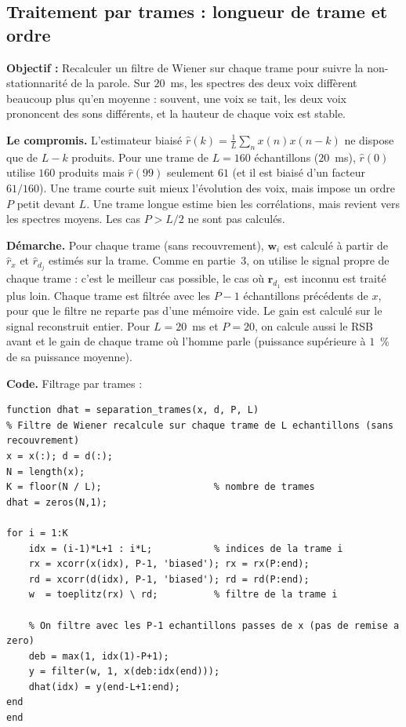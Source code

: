 \subsection{Traitement par trames : longueur de trame et ordre}

\begin{enonce}
\textbf{Objectif :} Recalculer un filtre de Wiener sur chaque trame pour suivre la non-stationnarité de la parole. Sur $20$~ms, les spectres des deux voix diffèrent beaucoup plus qu'en moyenne : souvent, une voix se tait, les deux voix prononcent des sons différents, et la hauteur de chaque voix est stable.
\end{enonce}

\textbf{Le compromis.} L'estimateur biaisé $\hat r(k)=\frac1L\sum_n x(n)x(n-k)$ ne dispose que de $L-k$ produits. Pour une trame de $L=160$ échantillons ($20$~ms), $\hat r(0)$ utilise $160$ produits mais $\hat r(99)$ seulement $61$ (et il est biaisé d'un facteur $61/160$). Une trame courte suit mieux l'évolution des voix, mais impose un ordre $P$ petit devant $L$. Une trame longue estime bien les corrélations, mais revient vers les spectres moyens. Les cas $P>L/2$ ne sont pas calculés.

\textbf{Démarche.} Pour chaque trame (sans recouvrement), $\mathbf{w}_i$ est calculé à partir de $\hat r_x$ et $\hat r_{d_j}$ estimés sur la trame. Comme en partie~3, on utilise le signal propre de chaque trame : c'est le meilleur cas possible, le cas où $\mathbf{r}_{d_1}$ est inconnu est traité plus loin. Chaque trame est filtrée avec les $P-1$ échantillons précédents de $x$, pour que le filtre ne reparte pas d'une mémoire vide. Le gain est calculé sur le signal reconstruit entier. Pour $L=20$~ms et $P=20$, on calcule aussi le RSB avant et le gain de chaque trame où l'homme parle (puissance supérieure à $1$~\% de sa puissance moyenne).

\textbf{Code.} Filtrage par trames :
\begin{lstlisting}
function dhat = separation_trames(x, d, P, L)
% Filtre de Wiener recalcule sur chaque trame de L echantillons (sans recouvrement)
x = x(:); d = d(:);
N = length(x);
K = floor(N / L);                    % nombre de trames
dhat = zeros(N,1);

for i = 1:K
    idx = (i-1)*L+1 : i*L;           % indices de la trame i
    rx = xcorr(x(idx), P-1, 'biased'); rx = rx(P:end);
    rd = xcorr(d(idx), P-1, 'biased'); rd = rd(P:end);
    w  = toeplitz(rx) \ rd;          % filtre de la trame i

    % On filtre avec les P-1 echantillons passes de x (pas de remise a zero)
    deb = max(1, idx(1)-P+1);
    y = filter(w, 1, x(deb:idx(end)));
    dhat(idx) = y(end-L+1:end);
end
end
\end{lstlisting}


